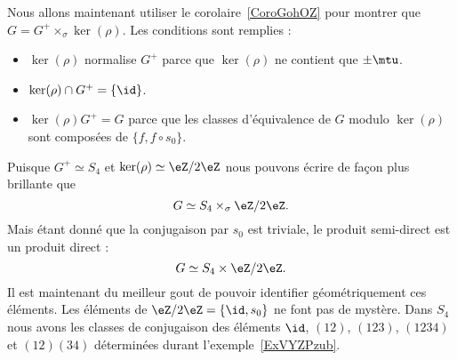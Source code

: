 Nous allons maintenant utiliser le corolaire~\ref{CoroGohOZ} pour montrer que \( G=G^+\times_{\sigma}\ker(\rho)\). Les conditions sont remplies :
\begin{itemize}
    \item \( \ker(\rho)\) normalise \( G^+\) parce que \( \ker(\rho)\) ne contient que \( \pm\mtu\).
    \item \( \ker(\rho)\cap G^+=\{ \id \}\).
    \item \( \ker(\rho)G^+=G\) parce que les classes d'équivalence de \( G\) modulo \( \ker(\rho)\) sont composées de \( \{ f,f\circ s_0 \}\).
\end{itemize}
Puisque \( G^+\simeq S_4\) et \( \ker(\rho)\simeq \eZ/2\eZ\) nous pouvons écrire de façon plus brillante que
\begin{equation}
    G\simeq S_4\times_{\sigma}\eZ/2\eZ.
\end{equation}
Mais étant donné que la conjugaison par \( s_0\) est triviale, le produit semi-direct est un produit direct :
\begin{equation}
    G\simeq S_4\times\eZ/2\eZ.
\end{equation}
Il est maintenant du meilleur gout de pouvoir identifier géométriquement ces éléments. Les éléments de \( \eZ/2\eZ=\{ \id,s_0 \}\) ne font pas de mystère. Dans \( S_4\) nous avons les classes de conjugaison des éléments \( \id\), \( (12)\), \( (123)\), \( (1234)\) et \( (12)(34)\) déterminées durant l'exemple~\ref{ExVYZPzub}.
